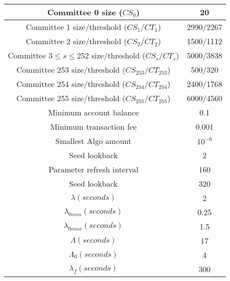 \documentclass[../main.tex]{subfiles}
\begin{document}
\begin{center}
\begin{tabular}{ |c|c| } 
 \hline
 Committee 0 size ($CS_0$) & 20 \\ 
 \hline
 Committee 1 size/threshold ($CS_1/CT_1$) & 2990/2267 \\ 
 \hline
 Committee 2 size/threshold ($CS_2/CT_2$) & 1500/1112 \\ 
 \hline
 Committee 3$\leq s \leq$252 size/threshold ($CS_s/CT_s$) &  5000/3838 \\ 
 \hline
 Committee 253 size/threshold ($CS_{253}/CT_{253}$) & 500/320 \\ 
 \hline
 Committee 254 size/threshold ($CS_{254}/CT_{254}$) & 2400/1768 \\ 
 \hline
 Committee 255 size/threshold ($CS_{255}/CT_{255}$) & 6000/4560 \\ 
 \hline
 Minimum account balance & 0.1\\
 \hline
 Minimum transaction fee & 0.001\\
 \hline
 Smallest Algo amount & $10^{-6}$\\
 \hline
 Seed lookback & 2\\
 \hline
 Parameter refresh interval & 160\\
 \hline
 Seed lookback & 320\\
 \hline
 $\lambda (seconds)$ & 2\\
 \hline
 $\lambda_{0min} (seconds)$ & 0.25\\
 \hline
 $\lambda_{0max} (seconds)$ & 1.5\\
 \hline
 $\Lambda (seconds)$ & 17\\
 \hline
 $\Lambda_0 (seconds)$ & 4\\
 \hline
 $\lambda_f (seconds)$ & 300\\
 \hline
\end{tabular}
\end{center}
\end{document}

